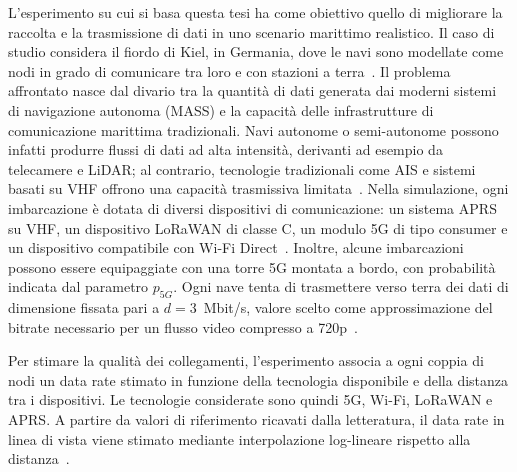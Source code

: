 L'esperimento su cui si basa questa tesi ha come obiettivo quello di migliorare la raccolta e la trasmissione di dati in uno scenario marittimo realistico. Il caso di studio considera il fiordo di Kiel, in Germania, dove le navi sono modellate come nodi in grado di comunicare tra loro e con stazioni a terra~\cite{11217861}. Il problema affrontato nasce dal divario tra la quantità di dati generata dai moderni sistemi di navigazione autonoma (\ac{MASS}) e la capacità delle infrastrutture di comunicazione marittima tradizionali. Navi autonome o semi-autonome possono infatti produrre flussi di dati ad alta intensità, derivanti ad esempio da telecamere e \ac{LiDAR}; al contrario, tecnologie tradizionali come \ac{AIS} e sistemi basati su \ac{VHF} offrono una capacità trasmissiva limitata~\cite{11217861}. Nella simulazione, ogni imbarcazione è dotata di diversi dispositivi di comunicazione: un sistema \ac{APRS} su \ac{VHF}, un dispositivo \ac{LoRaWAN} di classe C, un modulo 5G di tipo consumer e un dispositivo compatibile con Wi-Fi Direct~\cite{11217861}. Inoltre, alcune imbarcazioni possono essere equipaggiate con una torre 5G montata a bordo, con probabilità indicata dal parametro $p_{5G}$. Ogni nave tenta di trasmettere verso terra dei dati di dimensione fissata pari a $d = 3$~Mbit/s, valore scelto come approssimazione del bitrate necessario per un flusso video compresso a 720p~\cite{11217861}.

Per stimare la qualità dei collegamenti, l'esperimento associa a ogni coppia di nodi un data rate stimato in funzione della tecnologia disponibile e della distanza tra i dispositivi. Le tecnologie considerate sono quindi 5G, Wi-Fi, \ac{LoRaWAN} e \ac{APRS}. A partire da valori di riferimento ricavati dalla letteratura, il data rate in linea di vista viene stimato mediante interpolazione log-lineare rispetto alla distanza~\cite{11217861}.

